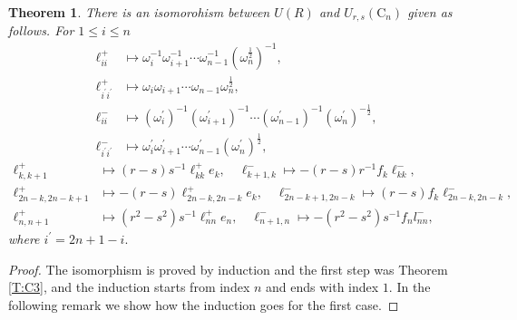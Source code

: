 \documentclass[10pt,a4paper]{amsart}
\newtheorem{theorem}{Theorem}
\numberwithin{equation}{section}
\begin{document}
 \begin{theorem}
 	There is an isomorohism between $U(R)$ and $U_{r, s}\left(\mathrm{C}_n\right)$ given as follows. For $1\leq i\leq n$
\begin{align*}
 	\ell_{i i}^{+}& \mapsto \omega_i^{-1} \omega_{i+1}^{-1} \cdots \omega_{n-1}^{-1}\left(\omega_n^{\frac{1}{2}}\right)^{-1}, \\
 	\ell_{i^{'} i^{'}}^{+}& \mapsto \omega_i \omega_{i+1} \cdots \omega_{n-1} \omega_n^{\frac{1}{2}},\\
 	\ell_{i i}^{-}& \mapsto\left(\omega_i^{\prime}\right)^{-1}\left(\omega_{i+1}^{\prime}\right)^{-1} \cdots\left(\omega_{n-1}^{\prime}\right)^{-1}\left(\omega_n^{\prime}\right)^{-\frac{1}{2}},\\
 	\ell_{i^{'} i^{'}}^{-}& \mapsto\omega_i^{\prime} \omega_{i+1}^{\prime} \cdots \omega_{n-1}^{\prime}\left(\omega_n^{\prime}\right)^{\frac{1}{2}},
 \end{align*}
 \begin{align*}
 	\ell_{k, k+1}^{+}&\mapsto (r-s) s^{-1} \ell_{k k}^{+} e_k, \quad \ell_{k+1, k}^{-}\mapsto -(r-s) r^{-1} f_k \ell_{k k}^{-},\\
\ell_{2 n-k, 2 n-k+1}^{+}&\mapsto -(r-s) \ell_{2 n-k, 2 n-k}^{+} e_k,\quad \ell_{2 n-k+1,2 n-k}^{-}\mapsto (r-s) f_k \ell_{2 n-k, 2 n-k}^{-} \text {, }\\
 	\ell_{n, n+1}^{+}& \mapsto \left(r^2-s^2\right) s^{-1} \ell_{n n}^{+} e_n, \quad \ell_{n+1, n}^{-}\mapsto -\left(r^2-s^2\right)s^{-1} f_n l_{n n}^{-},
 \end{align*}
 	where $i^{\prime}=2 n+1-i.$
 	\end{theorem}
 \begin{proof} The isomorphism is proved by induction and the first step was Theorem \ref{T:C3}, and the induction starts from index $n$ and ends with index $1$. In the following remark we show how the induction goes for the first case.
 	\end{proof}
\end{document}
